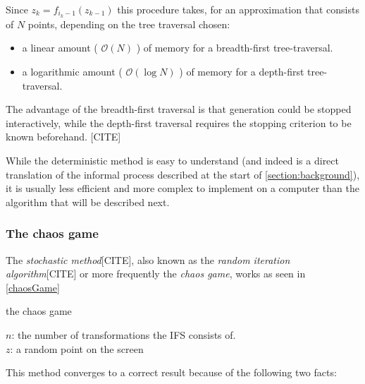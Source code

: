 \documentclass[11pt]{article}
\begin{document}
Since \(z_{k} = f_{i_k-1}(z_{k-1})\) this procedure takes, for an approximation that consists of \(N\) points, depending on the tree traversal chosen:

\begin{itemize}
\item a linear amount ( \(\mathcal{O}(N)\) ) of memory  for a breadth-first tree-traversal.
\item a logarithmic amount ( \(\mathcal{O}(\log{N})\) ) of memory for a depth-first tree-traversal.
\end{itemize}

The advantage of the breadth-first traversal is that generation could be stopped interactively,
while the depth-first traversal requires the stopping criterion to be known beforehand. [CITE]

While the deterministic method is easy to understand (and indeed is a direct translation of the informal process described at the start of \autoref{section:background}),
it is usually less efficient and more complex to implement on a computer than the algorithm that will be described next.

\subsubsection{The chaos game}
\label{sec:org6824b9c}
\label{subsection:chaos_game}

The \emph{stochastic method}[CITE], also known as the \emph{random iteration algorithm}[CITE] or more frequently the \emph{chaos game}, works as seen in \autoref{chaosGame}

\begin{algorithm}[H]
\caption{the chaos game}
\label{chaosGame}
  $n$: the number of transformations the IFS consists of. \\
  $z$: a random point on the screen  \\

\end{algorithm}

This method converges to a correct result because of the following two facts:
\end{document}
